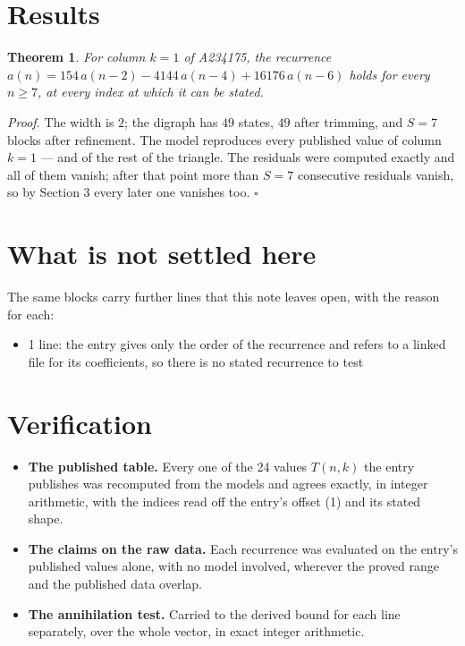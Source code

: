 \documentclass[11pt]{article}
\newtheorem{theorem}{Theorem}
\theoremstyle{definition}
\begin{document}
\section{Results}

\begin{theorem} For column $k = 1$ of A234175, the recurrence $a(n) = 154\,a(n-2) - 4144\,a(n-4) + 16176\,a(n-6)$ holds for every $n \ge 7$, at every index at which it can be stated.\end{theorem}

{\itshape Proof.} The width is $2$; the digraph has $49$ states, $49$ after trimming, and $S = 7$ blocks after refinement. The model reproduces every published value of column $k = 1$ --- and of the rest of the triangle. The residuals were computed exactly and all of them vanish; after that point more than $S = 7$ consecutive residuals vanish, so by Section 3 every later one vanishes too. $\square$

\section{What is not settled here}

The same blocks carry further lines that this note leaves open, with the reason for each:

\begin{itemize}

\item 1 line: the entry gives only the order of the recurrence and refers to a linked file for its coefficients, so there is no stated recurrence to test

\end{itemize}

\section{Verification}

\begin{itemize}

\item {\bfseries The published table.} Every one of the 24 values $T(n,k)$ the entry publishes was recomputed from the models and agrees exactly, in integer arithmetic, with the indices read off the entry's offset (1) and its stated shape.

\item {\bfseries The claims on the raw data.} Each recurrence was evaluated on the entry's published values alone, with no model involved, wherever the proved range and the published data overlap.

\item {\bfseries The annihilation test.} Carried to the derived bound for each line separately, over the whole vector, in exact integer arithmetic.

\end{itemize}
\end{document}

